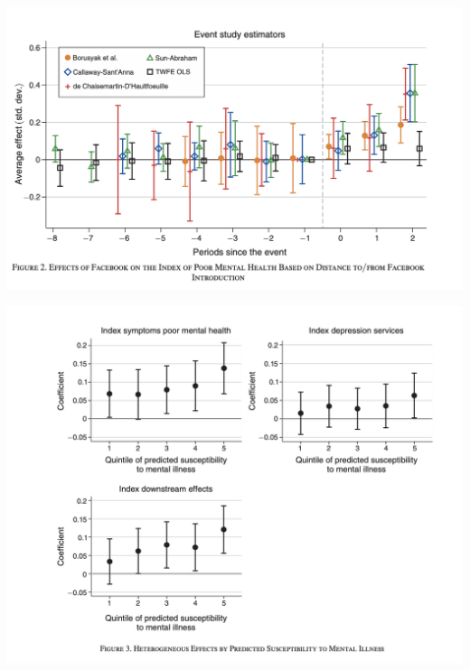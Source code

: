 \documentclass{beamer}
\begin{document}
\begin{frame}
\begin{center}
\includegraphics[scale=0.35]{./lecture_includes/facebook_3}
\end{center}
\end{frame}

\begin{frame}
\begin{center}
\includegraphics[scale=0.35]{./lecture_includes/facebook_4}
\end{center}
\end{frame}
\end{document}
